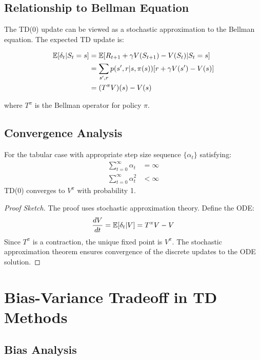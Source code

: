 \subsection{Relationship to Bellman Equation}

The TD(0) update can be viewed as a stochastic approximation to the Bellman equation. The expected TD update is:

\begin{align}
\mathbb{E}[\delta_t | S_t = s] &= \mathbb{E}[R_{t+1} + \gamma V(S_{t+1}) - V(S_t) | S_t = s] \\
&= \sum_{s',r} p(s',r|s,\pi(s))[r + \gamma V(s') - V(s)] \\
&= (T^\pi V)(s) - V(s)
\end{align}

where $T^\pi$ is the Bellman operator for policy $\pi$.

\subsection{Convergence Analysis}

\begin{theorem}
For the tabular case with appropriate step size sequence $\{\alpha_t\}$ satisfying:
\begin{align}
\sum_{t=0}^\infty \alpha_t &= \infty \\
\sum_{t=0}^\infty \alpha_t^2 &< \infty
\end{align}
TD(0) converges to $V^\pi$ with probability 1.
\end{theorem}

\begin{proof}[Proof Sketch]
The proof uses stochastic approximation theory. Define the ODE:
\begin{equation}
\frac{dV}{dt} = \mathbb{E}[\delta_t | V] = T^\pi V - V
\end{equation}
Since $T^\pi$ is a contraction, the unique fixed point is $V^\pi$. The stochastic approximation theorem ensures convergence of the discrete updates to the ODE solution.
\end{proof}

\section{Bias-Variance Tradeoff in TD Methods}

\subsection{Bias Analysis}

